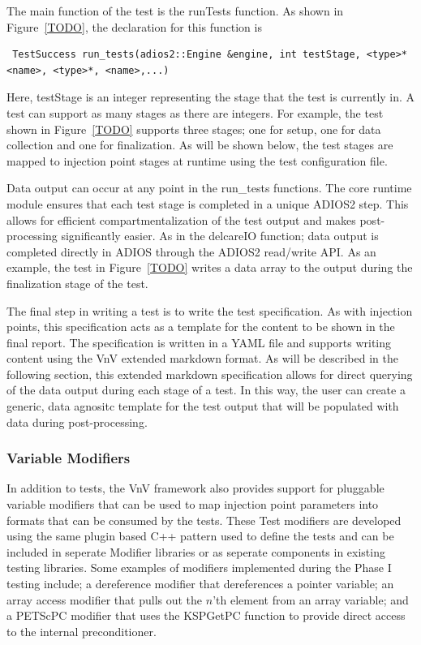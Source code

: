 The main function of the test is the runTests function. As shown in Figure~\ref{TODO}, the declaration for this function is

\begin{verbatim}
 TestSuccess run_tests(adios2::Engine &engine, int testStage, <type>* <name>, <type>*, <name>,...)
\end{verbatim}

Here, testStage is an integer representing the stage that the test is currently in. A test can support as many stages as there are integers. For example, 
the test shown in Figure~\ref{TODO} supports three stages; one for setup, one for data collection and one for finalization. As will be shown below, the test 
stages are mapped to injection point stages at runtime using the test configuration file. 

Data output can occur at any point in the run\_tests functions. The core runtime module ensures that each test stage is completed in a unique ADIOS2 step. This allows for efficient 
compartmentalization of the test output and makes post-processing significantly easier. As in the delcareIO function; data output is completed directly in ADIOS through the 
ADIOS2 read/write API. As an example, the test in Figure~\ref{TODO} writes a data array to the output during the finalization stage of the test. 

The final step in writing a test is to write the test specification. As with injection points, this specification acts as a template for the 
content to be shown in the final report. The specification is written in a YAML file and supports writing content using the VnV extended markdown format. As will be described 
in the following section, this extended markdown specification allows for direct querying of the data output during each stage of a \VV test. In this way, the user can 
create a generic, data agnositc template for the \VV test output that will be populated with data during post-processing. 

\subsubsection{Variable Modifiers}

In addition to tests, the VnV framework also provides support for pluggable variable modifiers that can be used to 
map injection point parameters into formats that can be consumed by the tests. These Test modifiers are developed using 
the same plugin based C++ pattern used to define the tests and can be included in seperate Modifier libraries or as seperate 
components in existing testing libraries. Some examples of modifiers implemented during the Phase I testing include; a dereference modifier
that dereferences a pointer variable; an array access modifier that pulls out the $n$'th element from an array variable; and a PETScPC modifier that
uses the KSPGetPC function to provide direct access to the internal preconditioner. 


